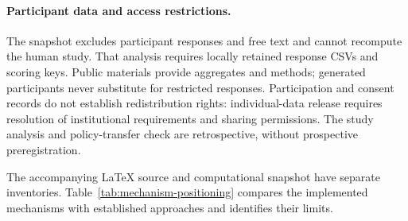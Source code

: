 \paragraph{Participant data and access restrictions.}
The snapshot excludes participant responses and free text and cannot recompute the human study. That analysis requires locally retained response CSVs and scoring keys. Public materials provide aggregates and methods; generated participants never substitute for restricted responses. Participation and consent records do not establish redistribution rights: individual-data release requires resolution of institutional requirements and sharing permissions. The study analysis and policy-transfer check are retrospective, without prospective preregistration.

The accompanying LaTeX source and computational snapshot have separate inventories. Table~\ref{tab:mechanism-positioning} compares the implemented mechanisms with established approaches and identifies their limits.
